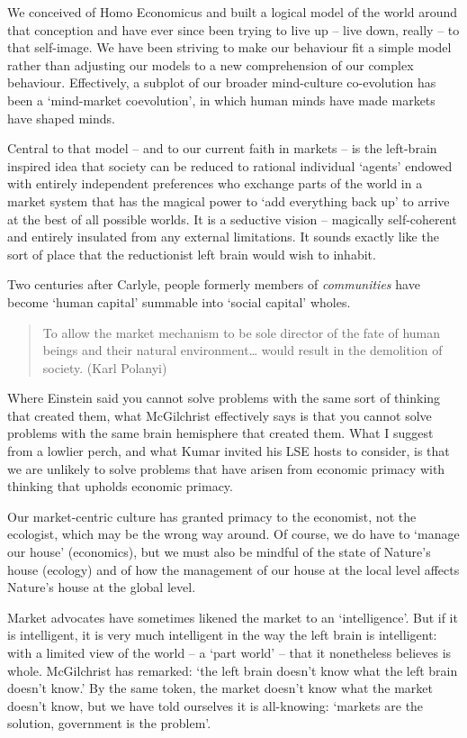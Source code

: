 \documentclass[
]{book}
\begin{document}
We conceived of Homo Economicus and built a logical model of the world around that conception and have ever since been trying to live up -- live down, really -- to that self-image. We have been striving to make our behaviour fit a simple model rather than adjusting our models to a new comprehension of our complex behaviour. Effectively, a subplot of our broader mind-culture co-evolution has been a `mind-market coevolution', in which human minds have made markets have shaped minds.

Central to that model -- and to our current faith in markets -- is the left-brain inspired idea that society can be reduced to rational individual `agents' endowed with entirely independent preferences who exchange parts of the world in a market system that has the magical power to `add everything back up' to arrive at the best of all possible worlds. It is a seductive vision -- magically self-coherent and entirely insulated from any external limitations. It sounds exactly like the sort of place that the reductionist left brain would wish to inhabit.

Two centuries after Carlyle, people formerly members of \emph{communities} have become `human capital' summable into `social capital' wholes.

\begin{quote}
To allow the market mechanism to be sole director of the fate of human beings and their natural environment\ldots{} would result in the demolition of society. (Karl Polanyi)
\end{quote}

Where Einstein said you cannot solve problems with the same sort of thinking that created them, what McGilchrist effectively says is that you cannot solve problems with the same brain hemisphere that created them. What I suggest from a lowlier perch, and what Kumar invited his LSE hosts to consider, is that we are unlikely to solve problems that have arisen from economic primacy with thinking that upholds economic primacy.

Our market-centric culture has granted primacy to the economist, not the ecologist, which may be the wrong way around. Of course, we do have to `manage our house' (economics), but we must also be mindful of the state of Nature's house (ecology) and of how the management of our house at the local level affects Nature's house at the global level.

Market advocates have sometimes likened the market to an `intelligence'. But if it is intelligent, it is very much intelligent in the way the left brain is intelligent: with a limited view of the world -- a `part world' -- that it nonetheless believes is whole. McGilchrist has remarked: `the left brain doesn't know what the left brain doesn't know.' By the same token, the market doesn't know what the market doesn't know, but we have told ourselves it is all-knowing: `markets are the solution, government is the problem'.
\end{document}
